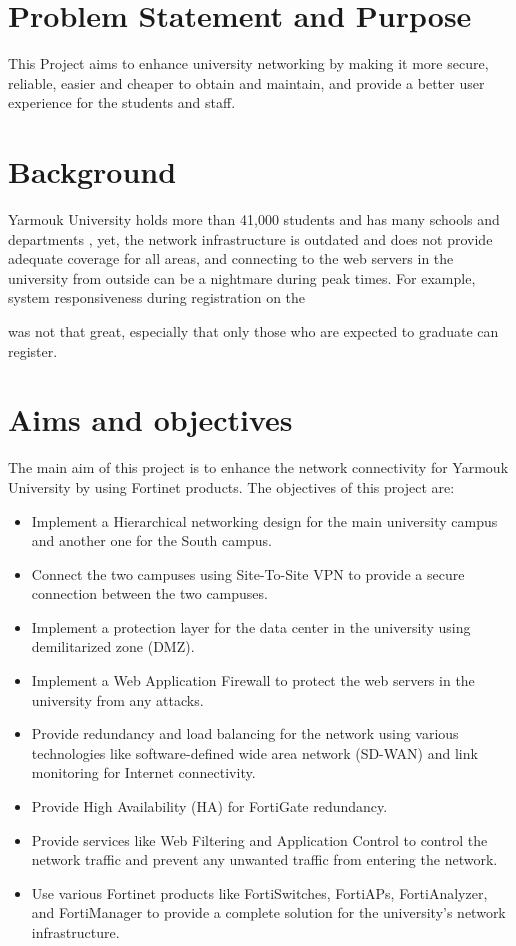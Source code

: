 \documentclass[12pt]{report}
\begin{document}
\section{Problem Statement and Purpose}
This Project aims to enhance university networking by making it more secure, 
reliable, easier and cheaper to obtain and maintain, and provide a better user experience for the students and staff.

\section{Background}
Yarmouk University holds more than 41,000 students and has many schools and departments \cite{YU} , yet, the network infrastructure is outdated and does not provide adequate coverage for all areas, and connecting to the web servers in the university from outside can be a nightmare during peak times. For example, system responsiveness during registration on the \date{19th of May, 2024} was not that great, especially that only those who are expected to graduate can register.
\section{Aims and objectives}
The main aim of this project is to enhance the network connectivity for Yarmouk University by using Fortinet products. The objectives of this project are:
\begin{itemize}
    \item Implement a Hierarchical networking design for the main university campus and another one for the South campus.
    \item Connect the two campuses using Site-To-Site VPN to provide a secure connection between the two campuses.
    \item Implement a protection layer for the data center in the university using demilitarized zone (DMZ).
    \item Implement a Web Application Firewall to protect the web servers in the university from any attacks.
    \item Provide redundancy and load balancing for the network using various technologies like software-defined wide area network (SD-WAN) and link monitoring for Internet connectivity.
    \item Provide High Availability (HA) for FortiGate redundancy.
    \item Provide services like Web Filtering and Application Control to control the network traffic and prevent any unwanted traffic from entering the network.
    \item Use various Fortinet products like FortiSwitches, FortiAPs, FortiAnalyzer, and FortiManager to provide a complete solution for the university's network infrastructure.
\end{itemize}
\end{document}
